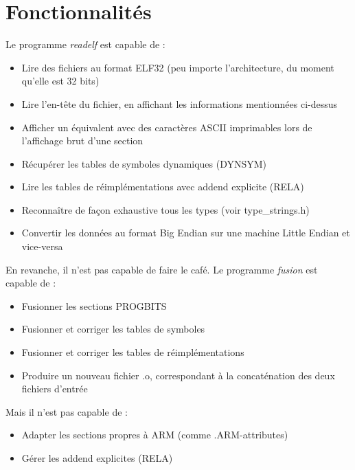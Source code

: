 \documentclass[a4paper,11pt]{article}
\begin{document}
\section{Fonctionnalités}
Le programme \textit{readelf} est capable de :
\begin{itemize}
\item Lire des fichiers au format ELF32 (peu importe l'architecture, du moment qu'elle est 32 bits)
\item Lire l'en-tête du fichier, en affichant les informations mentionnées ci-dessus
\item Afficher un équivalent avec des caractères ASCII imprimables lors de l'affichage brut d'une section
\item Récupérer les tables de symboles dynamiques (DYNSYM)
\item Lire les tables de réimplémentations avec addend explicite (RELA)
\item Reconnaître de façon exhaustive tous les types (voir type\_strings.h)
\item Convertir les données au format Big Endian sur une machine Little Endian et vice-versa
\end{itemize}
En revanche, il n'est pas capable de faire le café.
\newline\newline
Le programme \textit{fusion} est capable de :
\begin{itemize}
\item Fusionner les sections PROGBITS
\item Fusionner et corriger les tables de symboles
\item Fusionner et corriger les tables de réimplémentations
\item Produire un nouveau fichier .o, correspondant à la concaténation des deux fichiers d'entrée
\end{itemize}
Mais il n'est pas capable de :
\begin{itemize}
\item Adapter les sections propres à ARM (comme .ARM-attributes)
\item Gérer les addend explicites (RELA)
\end{itemize}
\end{document}
